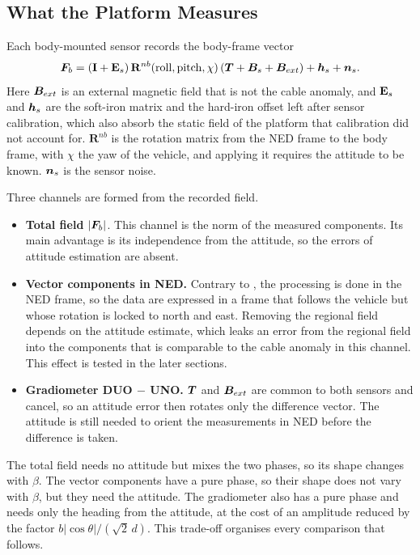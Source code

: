 \subsection{What the Platform Measures}\label{subsec:signal_model}

Each body-mounted sensor records the body-frame vector
\begin{equation}
    \bm{F}_b = (\mathbf{I} + \mathbf{E}_s)\,\mathbf{R}^{nb}(\mathrm{roll},\mathrm{pitch},\chi)\,(\bm{T} + \bm{B}_s + \bm{B}_{ext}) + \bm{h}_s + \bm{n}_s.
    \label{eq:recorded_field}
\end{equation}
Here $\bm{B}_{ext}$ is an external magnetic field that is not the cable anomaly, and $\mathbf{E}_s$ and $\bm{h}_s$ are the soft-iron matrix and the hard-iron offset left after sensor calibration, which also absorb the static field of the platform that calibration did not account for.
$\mathbf{R}^{nb}$ is the rotation matrix from the NED frame to the body frame, with $\chi$ the yaw of the vehicle, and applying it requires the attitude to be known.
$\bm{n}_s$ is the sensor noise.

Three channels are formed from the recorded field.
\begin{itemize}
    \item \textbf{Total field} $|\bm{F}_b|$. This channel is the norm of the measured components. Its main advantage is its independence from the attitude, so the errors of attitude estimation are absent.
    \item \textbf{Vector components in NED.} Contrary to \todo{[2]}, the processing is done in the NED frame, so the data are expressed in a frame that follows the vehicle but whose rotation is locked to north and east. Removing the regional field depends on the attitude estimate, which leaks an error from the regional field into the components that is comparable to the cable anomaly in this channel. This effect is tested in the later sections.
    \item \textbf{Gradiometer DUO $-$ UNO.} $\bm{T}$ and $\bm{B}_{ext}$ are common to both sensors and cancel, so an attitude error then rotates only the difference vector. The attitude is still needed to orient the measurements in NED before the difference is taken.
\end{itemize}

The total field needs no attitude but mixes the two phases, so its shape changes with $\beta$.
The vector components have a pure phase, so their shape does not vary with $\beta$, but they need the attitude.
The gradiometer also has a pure phase and needs only the heading from the attitude, at the cost of an amplitude reduced by the factor $b|\cos\theta|/(\sqrt{2}\,d)$.
This trade-off organises every comparison that follows.